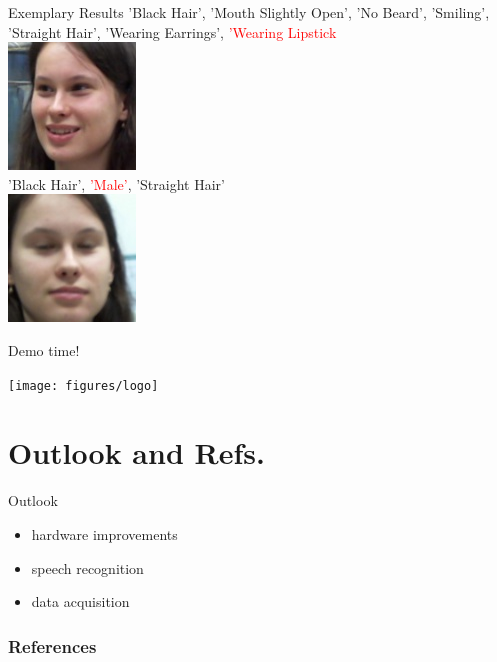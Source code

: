 \documentclass{beamer}
\begin{document}
\begin{frame}{Exemplary Results}
'Black Hair', 'Mouth Slightly Open', 'No Beard', 'Smiling', 'Straight Hair', 'Wearing Earrings', \textcolor{red}{'Wearing Lipstick}
 \\
 \centering
\includegraphics[height=0.3\textheight]{figures/leti_normalised24}\\
'Black Hair', \textcolor{red}{'Male'}, 'Straight Hair'\\
\centering
\includegraphics[height=0.3\textheight]{figures/leti_normalised0}
\end{frame}

\begin{frame}
	\centering
	\Huge{Demo time!}
	
	\vspace{5mm}
	\texttt{[image: figures/logo]}
\end{frame}

\section{Outlook and Refs.}
\begin{frame}{Outlook}
\begin{itemize}
 \item hardware improvements
 \item speech recognition
 \item data acquisition
\end{itemize}

\end{frame}

\begin{frame}
	\frametitle{References}
	\footnotesize
	
\end{frame}
\end{document}
